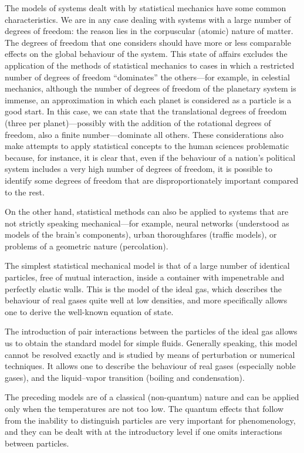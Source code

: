 \documentclass[11pt, a4paper, twoside, openright]{book}
\begin{document}
The models of systems dealt with by statistical mechanics have some common characteristics. We are in any case dealing with systems with a large number of degrees of freedom:  the reason lies in the corpuscular (atomic) nature of matter.
The degrees of freedom that one considers should have more or less comparable effects on the global behaviour of the system.  This state of affairs excludes the application of the methods of statistical mechanics to cases in which a restricted number of degrees of freedom “dominates” the others—for example, in celestial mechanics, although the number of degrees of freedom of the planetary system is immense, an approximation in which each planet is considered as a particle is a good start. In this case, we can state that the translational degrees of freedom (three per planet)—possibly with the addition of the rotational degrees of freedom, also a finite number—dominate all others.
These considerations also make attempts to apply statistical concepts to the human sciences problematic because, for instance, it is clear that, even if the behaviour of a nation’s political system includes a very high number of degrees of freedom, it is possible to identify some degrees of freedom that are disproportionately important compared to the rest.

On the other hand, statistical methods can also be applied to systems that are not strictly speaking mechanical—for example, neural networks (understood as models of the brain’s components), urban thoroughfares (traffic models), or problems of a geometric nature (percolation).

The simplest statistical mechanical model is that of a large number of identical particles, free of mutual interaction, inside a container with impenetrable and perfectly elastic walls. This is the model of the ideal gas, which describes the behaviour of real gases quite well at low densities, and more specifically allows one to derive the well-known equation of state.

The introduction of pair interactions between the particles of the ideal gas allows us to obtain the standard model for simple fluids. Generally speaking, this model cannot be resolved exactly and is studied by means of perturbation or numerical techniques. It allows one to describe the behaviour of real gases (especially noble gases), and the liquid–vapor transition (boiling and condensation).

The preceding models are of a classical (non-quantum) nature and can be applied only when the temperatures are not too low. The quantum effects that follow from the inability to distinguish particles are very important for phenomenology, and they can be dealt with at the introductory level if one omits interactions between particles. 
\end{document}

